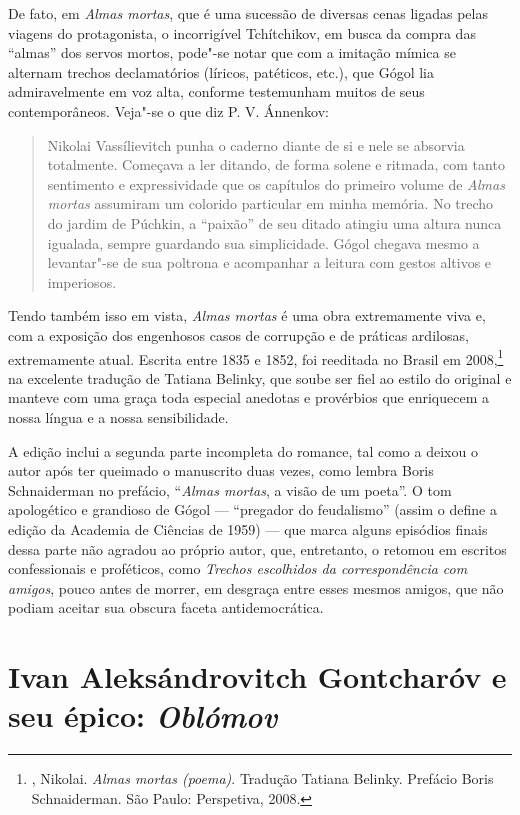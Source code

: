 De fato, em \emph{Almas mortas}, que é uma sucessão de diversas cenas ligadas pelas viagens do protagonista, o incorrigível Tchítchikov, em busca da compra das ``almas'' dos servos mortos, pode"-se notar que com a imitação mímica se alternam trechos declamatórios (líricos, patéticos, etc.), que Gógol lia admiravelmente em voz alta, conforme testemunham muitos de seus contemporâneos. Veja"-se o que diz P. V. Ánnenkov: 

\begin{quote}
Nikolai Vassílievitch punha o caderno diante de si e nele se absorvia totalmente. Começava a ler ditando, de forma solene e ritmada, com tanto sentimento e expressividade que os capítulos do primeiro volume de \emph{Almas mortas} assumiram um colorido particular em minha memória. No trecho do jardim de Púchkin, a ``paixão'' de seu ditado atingiu uma altura nunca igualada, sempre guardando sua simplicidade. Gógol chegava mesmo a levantar"-se de sua poltrona e acompanhar a leitura com gestos altivos e imperiosos. 
\end{quote}

Tendo também isso em vista, \emph{Almas mortas} é uma
obra extremamente viva e, com a exposição dos engenhosos casos de
corrupção e de práticas ardilosas, extremamente atual. Escrita entre
1835 e 1852, foi reeditada no Brasil em 2008,\footnote{, Nikolai. \emph{Almas mortas (poema)}. Tradução Tatiana Belinky. Prefácio Boris Schnaiderman. São Paulo: Perspetiva, 2008.} na excelente tradução de Tatiana Belinky, que soube ser fiel ao estilo do original e manteve com uma graça toda especial anedotas e provérbios que enriquecem a nossa língua e a nossa sensibilidade. 

A edição inclui a segunda parte incompleta do romance, tal como a deixou o autor após ter queimado o manuscrito duas vezes, como lembra Boris Schnaiderman no prefácio, ``\emph{Almas mortas}, a visão de um poeta''. O tom apologético e grandioso de Gógol --- ``pregador do
feudalismo'' (assim o define a edição da Academia de Ciências de 1959) ---
que marca alguns episódios finais dessa parte não agradou ao próprio
autor, que, entretanto, o retomou em escritos confessionais e proféticos,
como \emph{Trechos escolhidos da correspondência com amigos}, pouco antes de
morrer, em desgraça entre esses mesmos amigos, que não podiam aceitar sua
obscura faceta antidemocrática. 



\chapter{Ivan Aleksándrovitch Gontcharóv e seu épico: \emph{Oblómov}}

